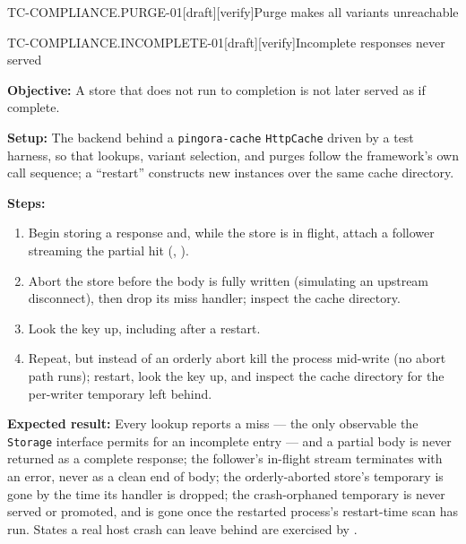 \begin{requirement}{TC-COMPLIANCE.PURGE-01}[draft][verify]{Purge makes all variants unreachable}


\end{requirement}

\begin{requirement}{TC-COMPLIANCE.INCOMPLETE-01}[draft][verify]{Incomplete responses never served}


  \textbf{Objective:} A store that does not run to completion is not later served
  as if complete.

  \textbf{Setup:} The backend behind a \texttt{pingora-cache}
  \texttt{HttpCache} driven by a test harness, so that lookups, variant
  selection, and purges follow the framework's own call sequence; a
  ``restart'' constructs new instances over the same cache directory.

  \textbf{Steps:}
  \begin{enumerate}
    \item Begin storing a response and, while the store is in flight, attach a
      follower streaming the partial hit
      (, ).
    \item Abort the store before the body is fully written (simulating an
      upstream disconnect), then drop its miss handler; inspect the cache
      directory.
    \item Look the key up, including after a restart.
    \item Repeat, but instead of an orderly abort kill the process mid-write
      (no abort path runs); restart, look the key up, and inspect the cache
      directory for the per-writer temporary left behind.
  \end{enumerate}

  \textbf{Expected result:} Every lookup reports a miss --- the only observable
  the \texttt{Storage} interface permits for an incomplete entry --- and a
  partial body is never returned as a complete response; the follower's
  in-flight stream terminates with an error, never as a clean end of body; the
  orderly-aborted store's temporary is gone by the time its handler is dropped;
  the crash-orphaned temporary is never served or promoted, and is gone once
  the restarted process's restart-time scan has run. States a real host crash
  can leave behind are exercised by .


\end{requirement}
